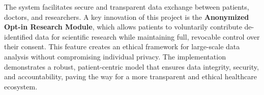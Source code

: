 \documentclass[12pt, a4paper]{report}
\begin{document}
The system facilitates secure and transparent data exchange between patients, doctors, and researchers. A key innovation of this project is the \textbf{Anonymized Opt-in Research Module}, which allows patients to voluntarily contribute de-identified data for scientific research while maintaining full, revocable control over their consent. This feature creates an ethical framework for large-scale data analysis without compromising individual privacy. The implementation demonstrates a robust, patient-centric model that ensures data integrity, security, and accountability, paving the way for a more transparent and ethical healthcare ecosystem.
\newpage

\tableofcontents
\newpage









\printbibliography
\end{document}
